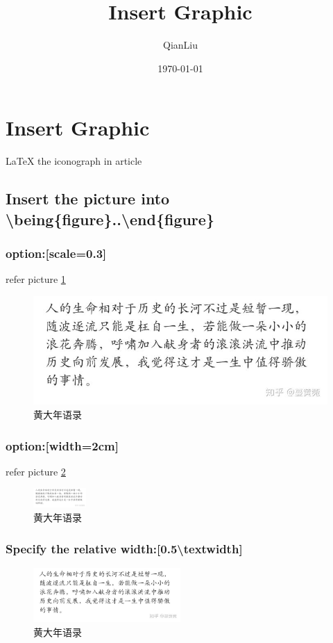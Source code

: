 \documentclass{article}
\author{QianLiu}
\date{\today}
\title{Insert Graphic}
\begin{document}
    \tableofcontents
    \maketitle
    \section{Insert Graphic}
    \LaTeX{ }the iconograph in article

    \subsection{Insert the picture into \textbackslash being\{figure\}..\textbackslash end\{figure\}}
        \subsubsection{option:[scale=0.3]}
        refer picture \ref{pic_1}
        \begin{figure}[htbp]
            \centering
            \includegraphics[scale=0.3]{huadanian}
            \caption{黄大年语录}
            \label{pic_1}
        \end{figure}
        
        \subsubsection{option:[width=2cm]}
        refer picture \ref{pic_2}
        \begin{figure}
            \centering
            \includegraphics[width=2cm]{huadanian.jpg}
            \caption{黄大年语录}
            \label{pic_2}
        \end{figure}

        \subsubsection{Specify the relative width:[0.5\textbackslash textwidth]}
        \begin{figure}[htbp]
            \centering
            \includegraphics[width=0.5\textwidth]{huadanian.jpg}
            \caption{黄大年语录}
        \end{figure}
\end{document}
